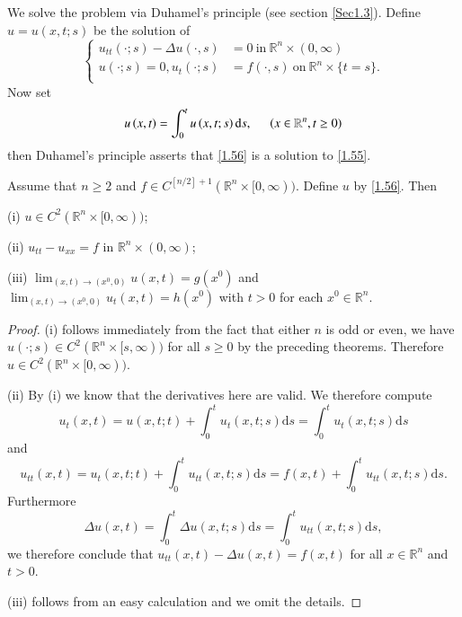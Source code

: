 We solve the problem via Duhamel's principle (see section \ref{Sec1.3}). Define $u=u(x,t;s)$ be the solution of 
$$
\left\{ \begin{aligned}
	u_{tt}\left( \cdot ;s \right) -\Delta u\left( \cdot ,s \right) &=0\ \text{in}\ \mathbb{R}^n\times(0,\infty)\\
	u\left( \cdot ;s \right) =0,u_t\left( \cdot ;s \right) &=f\left( \cdot ,s \right)\ \text{on}\ \mathbb{R}^n\times\{t=s\}.\\
\end{aligned} \right. 
$$
Now set 
\begin{equation}\label{1.56}
u\left( x,t \right) =\int_0^t{u\left( x,t;s \right) \mathrm{d}s},\hspace{0.5cm}\left( x\in \mathbb{R} ^n,t\ge 0 \right) 
\end{equation}
then Duhamel's principle asserts that \eqref{1.56} is a solution to \eqref{1.55}.
\begin{theorem}
Assume that $n\ge 2$ and $f\in C^{[n/2]+1}(\mathbb{R}^n\times[0,\infty))$. Define $u$ by \eqref{1.56}. Then \par
(i) $u\in C^2(\mathbb{R}^n\times[0,\infty))$;\par
(ii) $u_{tt}-u_{xx}=f$ in $\mathbb{R}^n\times(0,\infty)$;\par
(iii) $\lim_{(x,t)\to (x^0,0)}u(x,t)=g(x^0)$ and $\lim_{(x,t)\to (x^0,0)}u_t(x,t)=h(x^0)$ with $t>0$ for each $x^0\in\mathbb{R}^n$.
\end{theorem}
\begin{proof}
(i) follows immediately from the fact that either $n$ is odd or even, we have $u(\cdot;s)\in C^2(\mathbb{R}^n\times[s,\infty))$ for all $s\ge 0$ by the preceding theorems. Therefore $u\in C^2(\mathbb{R}^n\times[0,\infty))$.\par
(ii) By (i) we know that the derivatives here are valid. We therefore compute 
$$
u_t\left( x,t \right) =u\left( x,t;t \right) +\int_0^t{u_t\left( x,t;s \right) \mathrm{d}s}=\int_0^t{u_t\left( x,t;s \right) \mathrm{d}s}
$$
and 
$$
u_{tt}\left( x,t \right) =u_t\left( x,t;t \right) +\int_0^t{u_{tt}\left( x,t;s \right) \mathrm{d}s}=f\left( x,t \right) +\int_0^t{u_{tt}\left( x,t;s \right) \mathrm{d}s}.
$$
Furthermore 
$$
\Delta u\left( x,t \right) =\int_0^t{\Delta u\left( x,t;s \right) \mathrm{d}s}=\int_0^t{u_{tt}\left( x,t;s \right) \mathrm{d}s},
$$
we therefore conclude that $u_{tt}(x,t)-\Delta u(x,t)=f(x,t)$ for all $x\in\mathbb{R}^n$ and $t>0$.\par
(iii) follows from an easy calculation and we omit the details.
\end{proof}
